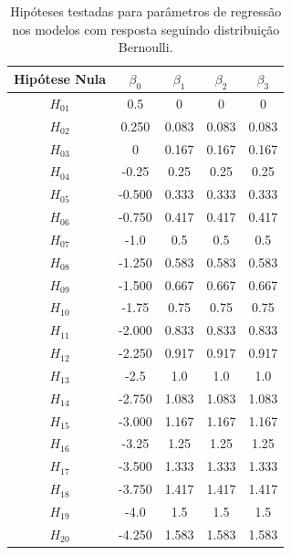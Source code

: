 \documentclass[AMA,STIX1COL]{WileyNJD-v2}
\begin{document}
\begin{table}[H]
\centering
\begin{tabular}{c|cccc}
\hline
Hipótese Nula & $\beta_0$ & $\beta_1$ & $\beta_2$ & $\beta_3$ \\ \hline
$H_{01}$      & 0.5       & 0         & 0         & 0         \\
$H_{02}$      & 0.250     & 0.083     & 0.083     & 0.083     \\
$H_{03}$      & 0         & 0.167     & 0.167     & 0.167     \\
$H_{04}$      & -0.25     & 0.25      & 0.25      & 0.25      \\
$H_{05}$      & -0.500    & 0.333     & 0.333     & 0.333     \\
$H_{06}$      & -0.750    & 0.417     & 0.417     & 0.417     \\
$H_{07}$      & -1.0      & 0.5       & 0.5       & 0.5       \\
$H_{08}$      & -1.250    & 0.583     & 0.583     & 0.583     \\
$H_{09}$      & -1.500    & 0.667     & 0.667     & 0.667     \\
$H_{10}$      & -1.75     & 0.75      & 0.75      & 0.75      \\
$H_{11}$      & -2.000    & 0.833     & 0.833     & 0.833     \\
$H_{12}$      & -2.250    & 0.917     & 0.917     & 0.917     \\
$H_{13}$      & -2.5      & 1.0       & 1.0       & 1.0       \\
$H_{14}$      & -2.750    & 1.083     & 1.083     & 1.083     \\
$H_{15}$      & -3.000    & 1.167     & 1.167     & 1.167     \\
$H_{16}$      & -3.25     & 1.25      & 1.25      & 1.25      \\
$H_{17}$      & -3.500    & 1.333     & 1.333     & 1.333     \\
$H_{18}$      & -3.750    & 1.417     & 1.417     & 1.417     \\
$H_{19}$      & -4.0      & 1.5       & 1.5       & 1.5       \\
$H_{20}$      & -4.250    & 1.583     & 1.583     & 1.583     \\ \hline
\end{tabular}
\caption{Hipóteses testadas para parâmetros de regressão nos modelos com resposta seguindo distribuição Bernoulli.}
\label{tab:hipoteses_beta_bernoulli}
\end{table}
\end{document}
